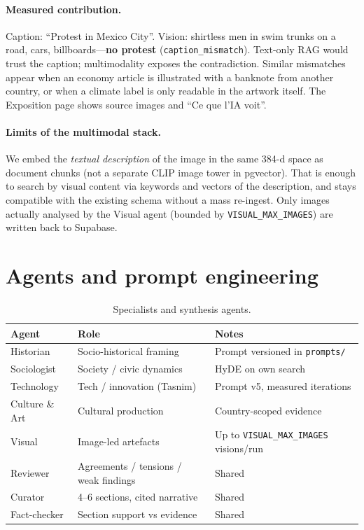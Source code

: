 \documentclass[11pt,a4paper]{article}
\begin{document}
\paragraph{Measured contribution.}
Caption: ``Protest in Mexico City''. Vision: shirtless men in swim trunks on a road, cars, billboards---\textbf{no protest} (\texttt{caption\_mismatch}). Text-only RAG would trust the caption; multimodality exposes the contradiction. Similar mismatches appear when an economy article is illustrated with a banknote from another country, or when a climate label is only readable in the artwork itself. The Exposition page shows source images and ``Ce que l'IA voit''.

\paragraph{Limits of the multimodal stack.}
We embed the \emph{textual description} of the image in the same 384-d space as document chunks (not a separate CLIP image tower in pgvector). That is enough to search by visual content via keywords and vectors of the description, and stays compatible with the existing schema without a mass re-ingest. Only images actually analysed by the Visual agent (bounded by \texttt{VISUAL\_MAX\_IMAGES}) are written back to Supabase.

\section{Agents and prompt engineering}

\begin{table}[h]
\centering
\small
\begin{tabular}{lll}
\toprule
Agent & Role & Notes \\
\midrule
Historian & Socio-historical framing & Prompt versioned in \texttt{prompts/} \\
Sociologist & Society / civic dynamics & HyDE on own search \\
Technology & Tech / innovation (Tasnim) & Prompt v5, measured iterations \\
Culture \& Art & Cultural production & Country-scoped evidence \\
Visual & Image-led artefacts & Up to \texttt{VISUAL\_MAX\_IMAGES} visions/run \\
Reviewer & Agreements / tensions / weak findings & Shared \\
Curator & 4--6 sections, cited narrative & Shared \\
Fact-checker & Section support vs evidence & Shared \\
\bottomrule
\end{tabular}
\caption{Specialists and synthesis agents.}
\end{table}
\end{document}
